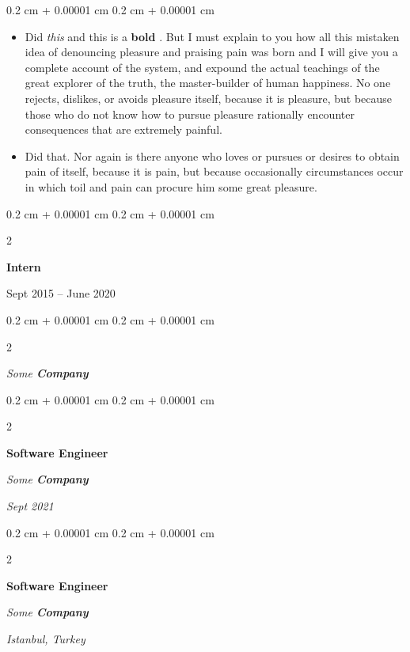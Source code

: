 \documentclass[10pt, letterpaper]{article}
\newenvironment{highlights}{
    \begin{itemize}[
        topsep=0.10 cm,
        parsep=0.10 cm,
        partopsep=0pt,
        itemsep=0pt,
        leftmargin=0.4 cm + 10pt
    ]
}{
    \end{itemize}
} %
\newenvironment{onecolentry}{
    \begin{adjustwidth}{
        0.2 cm + 0.00001 cm
    }{
        0.2 cm + 0.00001 cm
    }
}{
    \end{adjustwidth}
} %
\newenvironment{twocolentry}[2][]{
    \onecolentry
    \def\secondColumn{#2}
    \setcolumnwidth{\fill, 4.5 cm}
    \begin{paracol}{2}
}{
    \switchcolumn \raggedleft \secondColumn
    \end{paracol}
    \endonecolentry
} %
\let\hrefWithoutArrow\href
\renewcommand{\href}[2]{\hrefWithoutArrow{#1}{\ifthenelse{\equal{#2}{}}{ }{#2 }\raisebox{.15ex}{\footnotesize \faExternalLink*}}}
\begin{document}
        \vspace{0.10 cm}
        \begin{onecolentry}
            \begin{highlights}
                \item Did \textit{this} and this is a \textbf{bold} \href{https://example.com}{link}. But I must explain to you how all this mistaken idea of denouncing pleasure and praising pain was born and I will give you a complete account of the system, and expound the actual teachings of the great explorer of the truth, the master-builder of human happiness. No one rejects, dislikes, or avoids pleasure itself, because it is pleasure, but because those who do not know how to pursue pleasure rationally encounter consequences that are extremely painful.
                \item Did that. Nor again is there anyone who loves or pursues or desires to obtain pain of itself, because it is pain, but because occasionally circumstances occur in which toil and pain can procure him some great pleasure.
            \end{highlights}
        \end{onecolentry}


        \vspace{0.2 cm}

                \begin{twocolentry}{
                    Sept 2015 – June 2020
                }
                \textbf{Intern}
                \end{twocolentry}
            \begin{twocolentry}{
            }
            \textit{Some \textbf{Company}}
            \end{twocolentry}



        \vspace{0.2 cm}

            \begin{twocolentry}{


        \textit{Sept 2021}    }
                \textbf{Software Engineer}

                \textit{Some \textbf{Company}}
            \end{twocolentry}



        \vspace{0.2 cm}

            \begin{twocolentry}{
        \textit{Istanbul, Turkey}

            }
                \textbf{Software Engineer}

                \textit{Some \textbf{Company}}
            \end{twocolentry}
\end{document}
